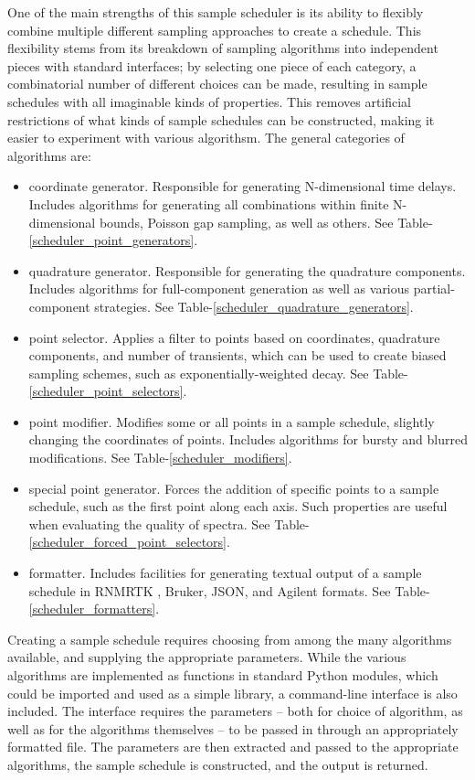 One of the main strengths of this sample scheduler is its ability to flexibly
combine multiple different sampling approaches to create a schedule.  This
flexibility stems from its breakdown of sampling algorithms into independent
pieces with standard interfaces; by selecting one piece of each category, 
a combinatorial number of different choices can be made, resulting in sample
schedules with all imaginable kinds of properties.  This removes artificial
restrictions of what kinds of sample schedules can be constructed, making it
easier to experiment with various algorithsm.  The general categories of 
algorithms are:
\begin{itemize}
  \item coordinate generator.  Responsible for generating N-dimensional time
    delays.  Includes algorithms for generating all combinations within finite
    N-dimensional bounds, Poisson gap \cite{poissongap} sampling, as well
    as others.  See Table-\ref{scheduler_point_generators}.
  \item quadrature generator.  Responsible for generating the quadrature
    components.  Includes algorithms for full-component generation as well
    as various partial-component strategies.
    See Table-\ref{scheduler_quadrature_generators}.
  \item point selector.  Applies a filter to points based on coordinates,
    quadrature components, and number of transients, which can be used to create
    biased sampling schemes, such as exponentially-weighted decay.
    See Table-\ref{scheduler_point_selectors}.
  \item point modifier.  Modifies some or all points in a sample schedule, 
    slightly changing the coordinates of points.  Includes algorithms for
    bursty \cite{maciejewski2009nonuniform} and blurred 
    \cite{hoch2008randomization} modifications.
    See Table-\ref{scheduler_modifiers}.
  \item special point generator.  Forces the addition of specific points to
    a sample schedule, such as the first point along each axis.  Such properties
    are useful when evaluating the quality of spectra.
    See Table-\ref{scheduler_forced_point_selectors}.
  \item formatter.  Includes facilities for generating textual output of a 
    sample schedule in RNMRTK \cite{rnmrtk}, Bruker, JSON, and Agilent formats.
    See Table-\ref{scheduler_formatters}.
\end{itemize}
Creating a sample schedule requires choosing from among the many algorithms 
available, and supplying the appropriate parameters.  While the various algorithms
are implemented as functions in standard Python modules, which could be imported
and used as a simple library, a command-line interface is also included.  The
interface requires the parameters -- both for choice of algorithm, as well as
for the algorithms themselves -- to be passed in through an appropriately
formatted file.  The parameters are then extracted and passed to the appropriate
algorithms, the sample schedule is constructed, and the output is returned. 

